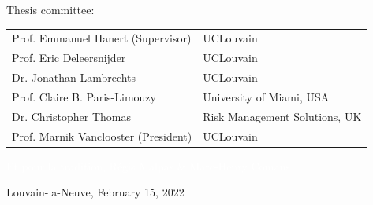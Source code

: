 \vspace*{0.5cm}
\begin{minipage}{\textwidth}
\begin{center}

\large Thesis committee:\\

\vspace*{0.5cm}
\footnotesize{
\hspace{-1cm}
\begin{tabular}{ll}
Prof. Emmanuel Hanert (Supervisor)   & UCLouvain \\
Prof. Eric Deleersnijder             & UCLouvain\\
Dr. Jonathan Lambrechts              & UCLouvain \\
Prof. Claire B. Paris-Limouzy        & University of Miami, USA \\
Dr. Christopher Thomas               & Risk Management Solutions, UK \\
Prof. Marnik Vanclooster (President) & UCLouvain
\end{tabular}
}
\newline
\vspace*{4em}
\newline
\textcolor{white}{Et pour la tradition, Régis Malpas \& Marc-Henry Comans}

\end{center}
\end{minipage}

\vspace*{.5cm}
\begin{minipage}{\textwidth}
\centering
\large Louvain-la-Neuve, February 15, 2022
\end{minipage}
